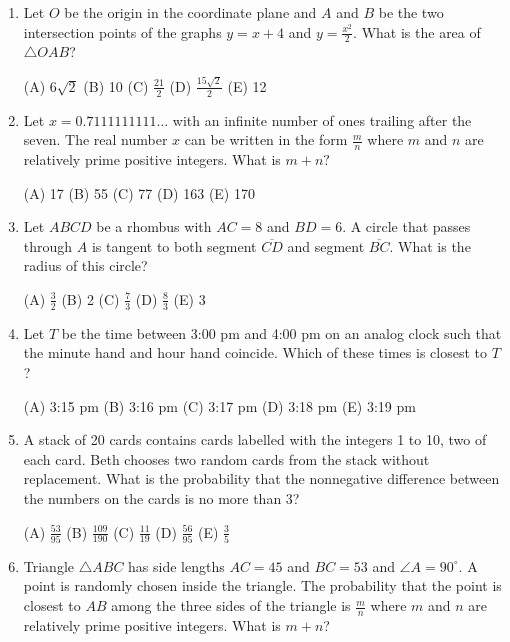 \documentclass[12pt]{scrartcl}
\begin{document}
\begin{enumerate}
\quad (A) 13 \quad (B) 14 \quad (C) 16 \quad (D) 17 \quad (E) 19

\item Let $O$ be the origin in the coordinate plane and $A$ and $B$ be the two intersection points of the graphs $y=x+4$ and $y=\frac{x^{2}}{2}$. What is the area of $\triangle OAB$?

\quad (A) $6\sqrt{2}$ \quad (B) 10 \quad (C) $\frac{21}{2}$ \quad (D) $\frac{15\sqrt{2}}{2}$ \quad (E) 12

\item Let $x=0.7111111111\dots$ with an infinite number of ones trailing after the seven. The real number $x$ can be written in the form $\frac{m}{n}$ where $m$ and $n$ are relatively prime positive integers. What is $m+n?$

\quad (A) 17 \quad (B) 55 \quad (C) 77 \quad (D) 163 \quad (E) 170

\item Let $ABCD$ be a rhombus with $AC=8$ and $BD=6$. A circle that passes through $A$ is tangent to both segment $\overline{CD}$ and segment $\overline{BC}$. What is the radius of this circle?

\quad (A) $\frac{3}{2}$ \quad (B) 2 \quad (C) $\frac{7}{3}$ \quad (D) $\frac{8}{3}$ \quad (E) 3

\item Let $T$ be the time between 3:00 pm and 4:00 pm on an analog clock such that the minute hand and hour hand coincide. Which of these times is closest to $T$?

\quad (A) 3:15 pm \quad (B) 3:16 pm \quad (C) 3:17 pm \quad (D) 3:18 pm \quad (E) 3:19 pm

\item A stack of 20 cards contains cards labelled with the integers 1 to 10, two of each card. Beth chooses two random cards from the stack without replacement. What is the probability that the nonnegative difference between the numbers on the cards is no more than 3?

\quad (A) $\frac{53}{95}$ \quad (B) $\frac{109}{190}$ \quad (C) $\frac{11}{19}$ \quad (D) $\frac{56}{95}$ \quad (E) $\frac{3}{5}$

\item Triangle $\triangle ABC$ has side lengths $AC=45$ and $BC=53$ and $\angle A=90^{\circ}$. A point is randomly chosen inside the triangle. The probability that the point is closest to $AB$ among the three sides of the triangle is $\frac{m}{n}$ where $m$ and $n$ are relatively prime positive integers. What is $m+n$?


\end{enumerate}
\end{document}
